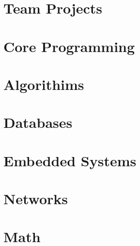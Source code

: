 \section{Team Projects}
\hypertarget{cat:team}{}
\newpage









\section{Core Programming}
\hypertarget{cat:programming}{}




\section{Algorithims}
\hypertarget{cat:algo}{}



\section{Databases}
\hypertarget{cat:database}{}





\section{Embedded Systems}
\hypertarget{cat:embedded}{}




\section{Networks}
\hypertarget{cat:network}{}



\section{Math}
\hypertarget{cat:math}{}












